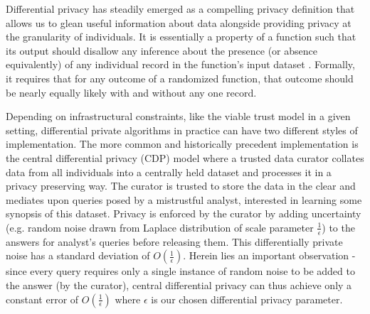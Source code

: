 Differential privacy has steadily emerged as a compelling privacy definition that allows us to glean useful information about data alongside providing privacy at the granularity of individuals. %
It is essentially a property of a function such that its output  should disallow any inference about the
 presence (or absence equivalently) of any individual record in the function's input dataset \cite{dwork}. 
Formally, it requires that for any outcome of a randomized function, that outcome should be nearly equally likely with and without any one record. \par
Depending on infrastructural constraints, like the viable trust model in a given setting, differential private algorithms in practice can have two different styles of implementation.  The more common and historically precedent implementation is the central differential privacy (\textsf{CDP}) model where a trusted data curator collates data from all individuals into a centrally held dataset and processes it in a privacy preserving way. %
 The curator is trusted to store the data in the clear and mediates upon queries posed by a mistrustful analyst, interested in learning some synopsis of this dataset. Privacy is enforced by the curator by adding uncertainty (e.g. random noise drawn from Laplace distribution of scale parameter $\frac{1}{\epsilon}$) to the answers for analyst's queries before releasing them.  This differentially private noise has a standard deviation of $O(\frac{1}{\epsilon})$. Herein lies an important observation - since every query requires only a single instance of random noise to be added to the answer (by the curator), central differential privacy can thus achieve only a constant error of $O(\frac{1}{\epsilon})$ where $\epsilon$ is our chosen differential privacy parameter. 
